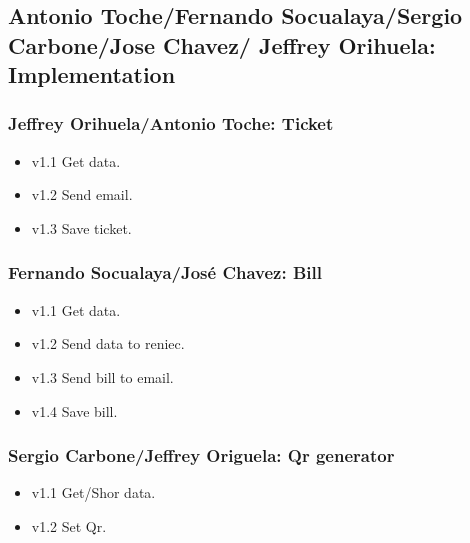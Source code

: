 \documentclass{article}
\begin{document}
 \subsection{Antonio Toche/Fernando Socualaya/Sergio Carbone/Jose Chavez/ Jeffrey Orihuela: Implementation}
 \blindtext
\subsubsection{Jeffrey Orihuela/Antonio Toche: Ticket}
\begin{itemize}
\item v1.1 Get data.
\item v1.2 Send email.
\item v1.3 Save ticket.
\end{itemize}


\subsubsection{Fernando Socualaya/José Chavez: Bill}
\begin{itemize}
\item v1.1 Get data.
\item v1.2 Send data to reniec.
\item v1.3 Send bill to email.
\item v1.4 Save bill.
\end{itemize}

\subsubsection{Sergio Carbone/Jeffrey Origuela: Qr generator}
\begin{itemize}
\item v1.1 Get/Shor data.
\item v1.2 Set Qr.
\end{itemize}
\end{document}
